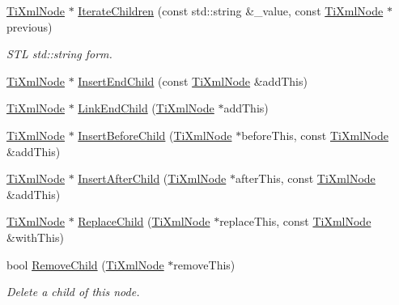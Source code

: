 \begin{DoxyCompactItemize}
\hypertarget{class_ti_xml_node_a16e9ad53e2f5445b14bf325c90aa862c}{}\label{class_ti_xml_node_a16e9ad53e2f5445b14bf325c90aa862c} 
\hyperlink{class_ti_xml_node}{Ti\+Xml\+Node} $\ast$ \hyperlink{class_ti_xml_node_a16e9ad53e2f5445b14bf325c90aa862c}{Iterate\+Children} (const std\+::string \&\+\_\+value, const \hyperlink{class_ti_xml_node}{Ti\+Xml\+Node} $\ast$previous)
\begin{DoxyCompactList}\small\item\em S\+TL std\+::string form. \end{DoxyCompactList}\item 
\hyperlink{class_ti_xml_node}{Ti\+Xml\+Node} $\ast$ \hyperlink{class_ti_xml_node_af287a913ce46d8dbf7ef24fec69bbaf0}{Insert\+End\+Child} (const \hyperlink{class_ti_xml_node}{Ti\+Xml\+Node} \&add\+This)
\item 
\hyperlink{class_ti_xml_node}{Ti\+Xml\+Node} $\ast$ \hyperlink{class_ti_xml_node_a1a881212554b759865f6cac79a851d38}{Link\+End\+Child} (\hyperlink{class_ti_xml_node}{Ti\+Xml\+Node} $\ast$add\+This)
\item 
\hyperlink{class_ti_xml_node}{Ti\+Xml\+Node} $\ast$ \hyperlink{class_ti_xml_node_a71e54e393336382bc9875f64aab5cb15}{Insert\+Before\+Child} (\hyperlink{class_ti_xml_node}{Ti\+Xml\+Node} $\ast$before\+This, const \hyperlink{class_ti_xml_node}{Ti\+Xml\+Node} \&add\+This)
\item 
\hyperlink{class_ti_xml_node}{Ti\+Xml\+Node} $\ast$ \hyperlink{class_ti_xml_node_a274db3292218202805c093f66a964cb5}{Insert\+After\+Child} (\hyperlink{class_ti_xml_node}{Ti\+Xml\+Node} $\ast$after\+This, const \hyperlink{class_ti_xml_node}{Ti\+Xml\+Node} \&add\+This)
\item 
\hyperlink{class_ti_xml_node}{Ti\+Xml\+Node} $\ast$ \hyperlink{class_ti_xml_node_a543208c2c801c84a213529541e904b9f}{Replace\+Child} (\hyperlink{class_ti_xml_node}{Ti\+Xml\+Node} $\ast$replace\+This, const \hyperlink{class_ti_xml_node}{Ti\+Xml\+Node} \&with\+This)
\item 
\hypertarget{class_ti_xml_node_ae19d8510efc90596552f4feeac9a8fbf}{}\label{class_ti_xml_node_ae19d8510efc90596552f4feeac9a8fbf} 
bool \hyperlink{class_ti_xml_node_ae19d8510efc90596552f4feeac9a8fbf}{Remove\+Child} (\hyperlink{class_ti_xml_node}{Ti\+Xml\+Node} $\ast$remove\+This)
\begin{DoxyCompactList}\small\item\em Delete a child of this node. \end{DoxyCompactList}\item 
\hypertarget{class_ti_xml_node_a8aacf06b1a577ff0d7cfa502cc76da32}{}\label{class_ti_xml_node_a8aacf06b1a577ff0d7cfa502cc76da32} 

\end{DoxyCompactItemize}
